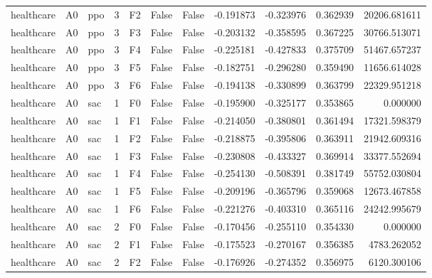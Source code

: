 \begin{tabular}{lllrlllrrrr}
healthcare &      A0 &       ppo &     3 &  F2 &           False &            False & -0.191873 & -0.323976 & 0.362939 &     20206.681611 \\
healthcare &      A0 &       ppo &     3 &  F3 &           False &            False & -0.203132 & -0.358595 & 0.367225 &     30766.513071 \\
healthcare &      A0 &       ppo &     3 &  F4 &           False &            False & -0.225181 & -0.427833 & 0.375709 &     51467.657237 \\
healthcare &      A0 &       ppo &     3 &  F5 &           False &            False & -0.182751 & -0.296280 & 0.359490 &     11656.614028 \\
healthcare &      A0 &       ppo &     3 &  F6 &           False &            False & -0.194138 & -0.330899 & 0.363799 &     22329.951218 \\
healthcare &      A0 &       sac &     1 &  F0 &           False &            False & -0.195900 & -0.325177 & 0.353865 &         0.000000 \\
healthcare &      A0 &       sac &     1 &  F1 &           False &            False & -0.214050 & -0.380801 & 0.361494 &     17321.598379 \\
healthcare &      A0 &       sac &     1 &  F2 &           False &            False & -0.218875 & -0.395806 & 0.363911 &     21942.609316 \\
healthcare &      A0 &       sac &     1 &  F3 &           False &            False & -0.230808 & -0.433327 & 0.369914 &     33377.552694 \\
healthcare &      A0 &       sac &     1 &  F4 &           False &            False & -0.254130 & -0.508391 & 0.381749 &     55752.030804 \\
healthcare &      A0 &       sac &     1 &  F5 &           False &            False & -0.209196 & -0.365796 & 0.359068 &     12673.467858 \\
healthcare &      A0 &       sac &     1 &  F6 &           False &            False & -0.221276 & -0.403310 & 0.365116 &     24242.995679 \\
healthcare &      A0 &       sac &     2 &  F0 &           False &            False & -0.170456 & -0.255110 & 0.354330 &         0.000000 \\
healthcare &      A0 &       sac &     2 &  F1 &           False &            False & -0.175523 & -0.270167 & 0.356385 &      4783.262052 \\
healthcare &      A0 &       sac &     2 &  F2 &           False &            False & -0.176926 & -0.274352 & 0.356975 &      6120.300106 \\

\end{tabular}
